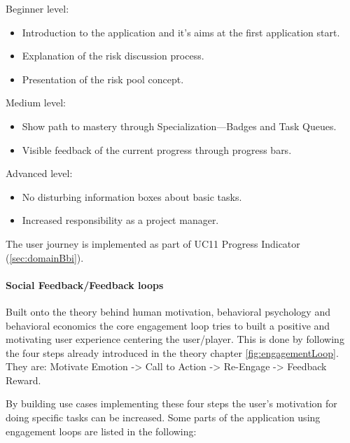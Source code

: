 \noindent
Beginner level:
\begin{itemize}
	\item Introduction to the application and it's aims at the first application start.
	\item Explanation of the risk discussion process.
	\item Presentation of the risk pool concept.
\end{itemize}

\noindent
Medium level:
\begin{itemize}
	\item Show path to mastery through Specialization—Badges and Task Queues.
	\item Visible feedback of the current progress through progress bars.
\end{itemize}

\noindent
Advanced level:
\begin{itemize}
	\item No disturbing information boxes about basic tasks.
	\item Increased responsibility as a project manager.
\end{itemize}

\noindent
The user journey is implemented as part of \ac{UC}11 Progress Indicator (\ref{sec:domainBbi}).

\paragraph*{Social Feedback/Feedback loops}

Built onto the theory behind human motivation, behavioral psychology and behavioral economics the core engagement loop tries to built a positive and motivating user experience centering the user/player. This is done by following the four steps already introduced in the theory chapter \ref{fig:engagementLoop}. They are: Motivate Emotion -> Call to Action -> Re-Engage -> Feedback Reward. 

By building use cases implementing these four steps the user's motivation for doing specific tasks can be increased. Some parts of the application using engagement loops are listed in the following:

